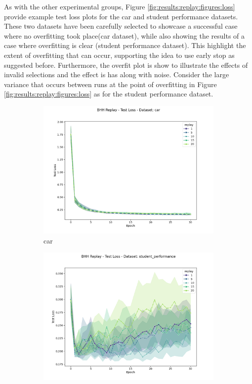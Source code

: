 As with the other experimental groups, Figure \ref{fig:results:replay:figures:loss} provide example test loss plots for the car and student performance datasets. These two datasets have been carefully selected to showcase a successful case where no overfitting took place(car dataset), while also showing the results of a case where overfitting is clear (student performance dataset). This highlight the extent of overfitting that can occur, supporting the idea to use early stop as suggested before. Furthermore, the overfit plot is show to illustrate the effects of invalid selections and the effect is has along with noise. Consider the large variance that occurs between runs at the point of overfitting in Figure \ref{fig:results:replay:figures:loss} as for the student performance dataset.


\begin{figure}[htbp]
	\begin{subfigure}{0.5\textwidth}
    	\centering
        \includegraphics[width=\textwidth]{analysis/bhh_replay/figures/test/loss/car.png}
        \caption{car}
        \label{fig:results:replay:figures:loss1}
	\end{subfigure}
	\begin{subfigure}{0.5\textwidth}
    	\centering
        \includegraphics[width=\textwidth]{analysis/bhh_replay/figures/test/loss/student_performance.png}

\end{subfigure}
\end{figure}
